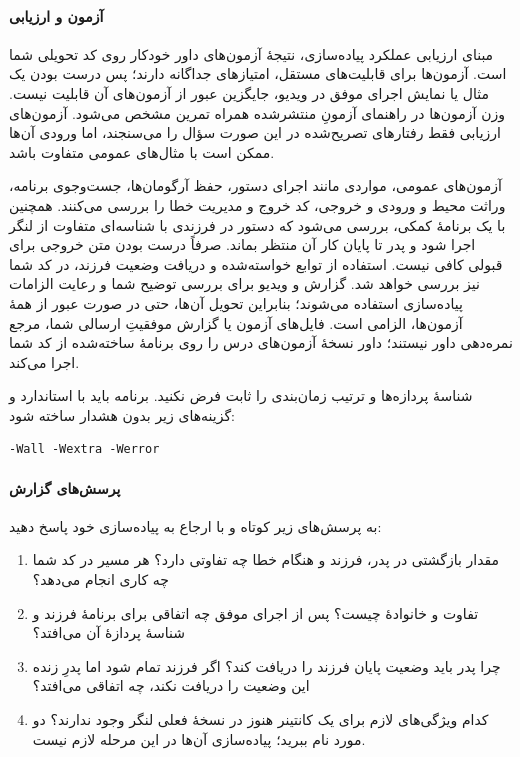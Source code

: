 \paragraph{آزمون و ارزیابی}
مبنای ارزیابی عملکرد پیاده‌سازی، نتیجهٔ آزمون‌های داور خودکار روی کد
تحویلی شما است. آزمون‌ها برای قابلیت‌های مستقل، امتیازهای جداگانه دارند؛
پس درست بودن یک مثال یا نمایش اجرای موفق در ویدیو، جایگزین عبور از
آزمون‌های آن قابلیت نیست. وزن آزمون‌ها در راهنمای آزمونِ منتشرشده همراه
تمرین مشخص می‌شود. آزمون‌های ارزیابی فقط رفتارهای تصریح‌شده در این
صورت سؤال را می‌سنجند، اما ورودی آن‌ها ممکن است با مثال‌های عمومی
متفاوت باشد.

آزمون‌های عمومی، مواردی مانند اجرای دستور، حفظ آرگومان‌ها، جست‌وجوی
برنامه، وراثت محیط و ورودی و خروجی، کد خروج و مدیریت خطا را بررسی می‌کنند.
همچنین با یک برنامهٔ کمکی، بررسی می‌شود که دستور در فرزندی با شناسه‌ای
متفاوت از لنگر اجرا شود و پدر تا پایان کار آن منتظر بماند. صرفاً درست
بودن متن خروجی برای قبولی کافی نیست. استفاده از توابع خواسته‌شده و
دریافت وضعیت فرزند، در کد شما نیز بررسی خواهد شد.
گزارش و ویدیو برای بررسی توضیح شما و رعایت الزامات پیاده‌سازی استفاده
می‌شوند؛ بنابراین تحویل آن‌ها، حتی در صورت عبور از همهٔ آزمون‌ها،
الزامی است. فایل‌های آزمون یا گزارش موفقیتِ ارسالی شما، مرجع نمره‌دهی
داور نیستند؛ داور نسخهٔ آزمون‌های درس را روی برنامهٔ ساخته‌شده از کد
شما اجرا می‌کند.

شناسهٔ پردازه‌ها و ترتیب زمان‌بندی را ثابت فرض نکنید. برنامه باید با
استاندارد  و گزینه‌های زیر بدون هشدار ساخته شود:

\begin{latin}
\begin{verbatim}
-Wall -Wextra -Werror
\end{verbatim}
\end{latin}

\paragraph{پرسش‌های گزارش}
به پرسش‌های زیر کوتاه و با ارجاع به پیاده‌سازی خود پاسخ دهید:

\begin{enumerate}
  \item مقدار بازگشتی  در پدر، فرزند و هنگام خطا
  چه تفاوتی دارد؟ هر مسیر در کد شما چه کاری انجام می‌دهد؟
  \item تفاوت  و خانوادهٔ  چیست؟
  پس از اجرای موفق  چه اتفاقی برای برنامهٔ فرزند
  و شناسهٔ پردازهٔ آن می‌افتد؟
  \item چرا پدر باید وضعیت پایان فرزند را دریافت کند؟ اگر فرزند تمام
  شود اما پدرِ زنده این وضعیت را دریافت نکند، چه اتفاقی می‌افتد؟
  \item کدام ویژگی‌های لازم برای یک کانتینر هنوز در نسخهٔ فعلی لنگر
  وجود ندارند؟ دو مورد نام ببرید؛ پیاده‌سازی آن‌ها در این مرحله لازم نیست.
\end{enumerate}

